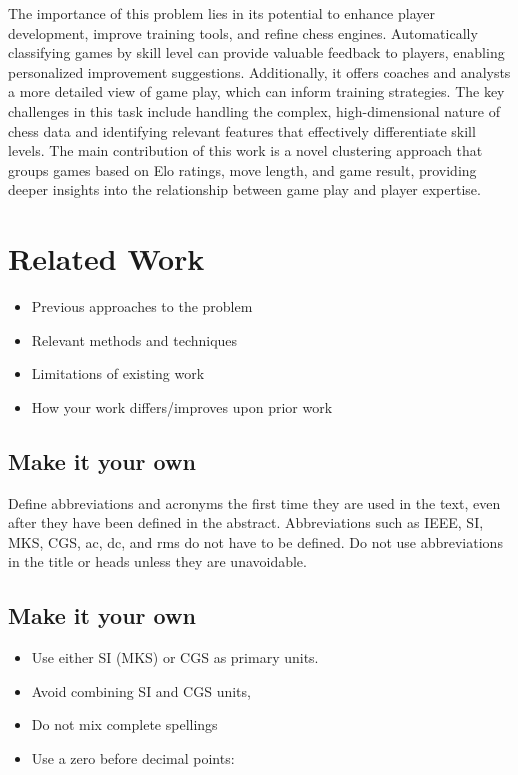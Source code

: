 \documentclass[conference]{IEEEtran}
\begin{document}
The importance of this problem lies in its potential to enhance player development, improve training tools, and refine chess engines. Automatically classifying games by skill level can provide valuable feedback to players, enabling personalized improvement suggestions. Additionally, it offers coaches and analysts a more detailed view of game play, which can inform training strategies. The key challenges in this task include handling the complex, high-dimensional nature of chess data and identifying relevant features that effectively differentiate skill levels. The main contribution of this work is a novel clustering approach that groups games based on Elo ratings, move length, and game result, providing deeper insights into the relationship between game play and player expertise.

\section{Related Work}
\begin{itemize}
\item Previous approaches to the problem
\item Relevant methods and techniques
\item Limitations of existing work
\item How your work differs/improves upon prior work
\end{itemize}

\subsection{Make it your own}\label{AA}
Define abbreviations and acronyms the first time they are used in the text, 
even after they have been defined in the abstract. Abbreviations such as 
IEEE, SI, MKS, CGS, ac, dc, and rms do not have to be defined. Do not use 
abbreviations in the title or heads unless they are unavoidable.

\subsection{Make it your own}
\begin{itemize}
\item Use either SI (MKS) or CGS as primary units.
\item Avoid combining SI and CGS units,
\item Do not mix complete spellings 
\item Use a zero before decimal points:
\end{itemize}
\end{document}
